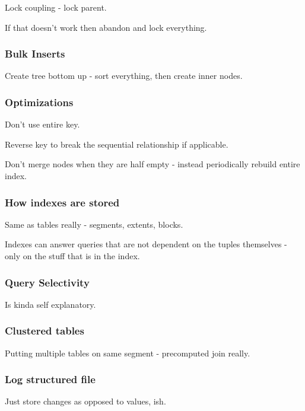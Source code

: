 \documentclass{article}
\begin{document}
				Lock coupling - lock parent.
				
				If that doesn't work then abandon and lock everything.
				
			\subsubsection{Bulk Inserts}
			
				Create tree bottom up - sort everything, then create inner nodes.
				
			\subsubsection{Optimizations}
			
				Don't use entire key.
				
				Reverse key to break the sequential relationship if applicable.
				
				Don't merge nodes when they are half empty - instead periodically rebuild entire index.
				
			\subsubsection{How indexes are stored}
 				
				Same as tables really - segments, extents, blocks.
				
				Indexes can answer queries that are not dependent on the tuples themselves - only on the stuff that is in the index.
				
			\subsubsection{Query Selectivity}
			
				Is kinda self explanatory.
				
			\subsubsection{Clustered tables}
			
				Putting multiple tables on same segment - precomputed join really.
				
			\subsubsection{Log structured file}
			
				Just store changes as opposed to values, ish.
				
\end{document}
